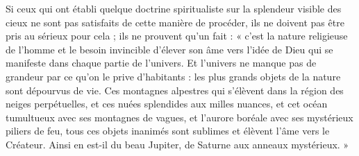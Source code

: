 \documentclass[a4paper, 11pt, oneside]{article}
\begin{document}
Si ceux qui ont établi quelque doctrine spiritualiste sur la splendeur visible des cieux ne sont pas satisfaits de cette manière de procéder, ils ne doivent pas être pris au sérieux pour cela ; ils ne prouvent qu'un fait : « c'est la nature religieuse de l'homme et le besoin invincible d'élever son âme vers l'idée de Dieu qui se manifeste dans chaque partie de l'univers. Et l'univers ne manque pas de grandeur par ce qu'on le prive d'habitants : les plus grands objets de la nature sont dépourvus de vie. Ces montagnes alpestres qui s'élèvent dans la région des neiges perpétuelles, et ces nuées splendides aux milles nuances, et cet océan tumultueux avec ses montagnes de vagues, et l'aurore boréale avec ses mystérieux piliers de feu, tous ces objets inanimés sont sublimes et élèvent l'âme vers le Créateur. Ainsi en est-il du beau Jupiter, de Saturne aux anneaux mystérieux. »
\end{document}
